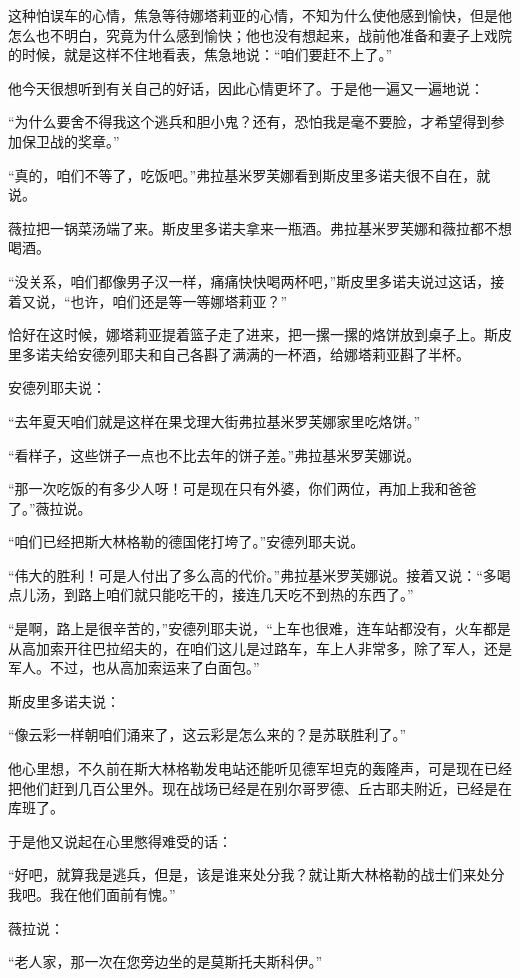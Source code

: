 这种怕误车的心情，焦急等待娜塔莉亚的心情，不知为什么使他感到愉快，但是他怎么也不明白，究竟为什么感到愉快；他也没有想起来，战前他准备和妻子上戏院的时候，就是这样不住地看表，焦急地说：“咱们要赶不上了。”

他今天很想听到有关自己的好话，因此心情更坏了。于是他一遍又一遍地说：

“为什么要舍不得我这个逃兵和胆小鬼？还有，恐怕我是毫不要脸，才希望得到参加保卫战的奖章。”

“真的，咱们不等了，吃饭吧。”弗拉基米罗芙娜看到斯皮里多诺夫很不自在，就说。

薇拉把一锅菜汤端了来。斯皮里多诺夫拿来一瓶酒。弗拉基米罗芙娜和薇拉都不想喝酒。

“没关系，咱们都像男子汉一样，痛痛快快喝两杯吧，”斯皮里多诺夫说过这话，接着又说，“也许，咱们还是等一等娜塔莉亚？”

恰好在这时候，娜塔莉亚提着篮子走了进来，把一摞一摞的烙饼放到桌子上。斯皮里多诺夫给安德列耶夫和自己各斟了满满的一杯酒，给娜塔莉亚斟了半杯。

安德列耶夫说：

“去年夏天咱们就是这样在果戈理大街弗拉基米罗芙娜家里吃烙饼。”

“看样子，这些饼子一点也不比去年的饼子差。”弗拉基米罗芙娜说。

“那一次吃饭的有多少人呀！可是现在只有外婆，你们两位，再加上我和爸爸了。”薇拉说。

“咱们已经把斯大林格勒的德国佬打垮了。”安德列耶夫说。

“伟大的胜利！可是人付出了多么高的代价。”弗拉基米罗芙娜说。接着又说：“多喝点儿汤，到路上咱们就只能吃干的，接连几天吃不到热的东西了。”

“是啊，路上是很辛苦的，”安德列耶夫说，“上车也很难，连车站都没有，火车都是从高加索开往巴拉绍夫的，在咱们这儿是过路车，车上人非常多，除了军人，还是军人。不过，也从高加索运来了白面包。”

斯皮里多诺夫说：

“像云彩一样朝咱们涌来了，这云彩是怎么来的？是苏联胜利了。”

他心里想，不久前在斯大林格勒发电站还能听见德军坦克的轰隆声，可是现在已经把他们赶到几百公里外。现在战场已经是在别尔哥罗德、丘古耶夫附近，已经是在库班了。

于是他又说起在心里憋得难受的话：

“好吧，就算我是逃兵，但是，该是谁来处分我？就让斯大林格勒的战士们来处分我吧。我在他们面前有愧。”

薇拉说：

“老人家，那一次在您旁边坐的是莫斯托夫斯科伊。”

